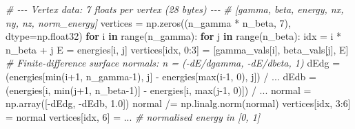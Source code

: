 \documentclass[
  11pt,
]{report}
\newenvironment{Shaded}{}{}
\newcommand{\BuiltInTok}[1]{\textcolor[rgb]{0.00,0.50,0.00}{#1}}
\newcommand{\CommentTok}[1]{\textcolor[rgb]{0.38,0.63,0.69}{\textit{#1}}}
\newcommand{\ControlFlowTok}[1]{\textcolor[rgb]{0.00,0.44,0.13}{\textbf{#1}}}
\newcommand{\DecValTok}[1]{\textcolor[rgb]{0.25,0.63,0.44}{#1}}
\newcommand{\FloatTok}[1]{\textcolor[rgb]{0.25,0.63,0.44}{#1}}
\newcommand{\KeywordTok}[1]{\textcolor[rgb]{0.00,0.44,0.13}{\textbf{#1}}}
\newcommand{\NormalTok}[1]{#1}
\newcommand{\OperatorTok}[1]{\textcolor[rgb]{0.40,0.40,0.40}{#1}}
\begin{document}
\begin{Shaded}
\begin{Highlighting}[]
    \CommentTok{\# {-}{-}{-} Vertex data: 7 floats per vertex (28 bytes) {-}{-}{-}}
    \CommentTok{\# [gamma, beta, energy, nx, ny, nz, norm\_energy]}
\NormalTok{    vertices }\OperatorTok{=}\NormalTok{ np.zeros((n\_gamma }\OperatorTok{*}\NormalTok{ n\_beta, }\DecValTok{7}\NormalTok{), dtype}\OperatorTok{=}\NormalTok{np.float32)}
    \ControlFlowTok{for}\NormalTok{ i }\KeywordTok{in} \BuiltInTok{range}\NormalTok{(n\_gamma):}
        \ControlFlowTok{for}\NormalTok{ j }\KeywordTok{in} \BuiltInTok{range}\NormalTok{(n\_beta):}
\NormalTok{            idx }\OperatorTok{=}\NormalTok{ i }\OperatorTok{*}\NormalTok{ n\_beta }\OperatorTok{+}\NormalTok{ j}
\NormalTok{            E }\OperatorTok{=}\NormalTok{ energies[i, j]}
\NormalTok{            vertices[idx, }\DecValTok{0}\NormalTok{:}\DecValTok{3}\NormalTok{] }\OperatorTok{=}\NormalTok{ [gamma\_vals[i], beta\_vals[j], E]}
            \CommentTok{\# Finite{-}difference surface normals: n = ({-}dE/dgamma, {-}dE/dbeta, 1)}
\NormalTok{            dEdg }\OperatorTok{=}\NormalTok{ (energies[}\BuiltInTok{min}\NormalTok{(i}\OperatorTok{+}\DecValTok{1}\NormalTok{, n\_gamma}\OperatorTok{{-}}\DecValTok{1}\NormalTok{), j] }\OperatorTok{{-}}\NormalTok{ energies[}\BuiltInTok{max}\NormalTok{(i}\OperatorTok{{-}}\DecValTok{1}\NormalTok{, }\DecValTok{0}\NormalTok{), j]) }\OperatorTok{/}\NormalTok{ ...}
\NormalTok{            dEdb }\OperatorTok{=}\NormalTok{ (energies[i, }\BuiltInTok{min}\NormalTok{(j}\OperatorTok{+}\DecValTok{1}\NormalTok{, n\_beta}\OperatorTok{{-}}\DecValTok{1}\NormalTok{)] }\OperatorTok{{-}}\NormalTok{ energies[i, }\BuiltInTok{max}\NormalTok{(j}\OperatorTok{{-}}\DecValTok{1}\NormalTok{, }\DecValTok{0}\NormalTok{)]) }\OperatorTok{/}\NormalTok{ ...}
\NormalTok{            normal }\OperatorTok{=}\NormalTok{ np.array([}\OperatorTok{{-}}\NormalTok{dEdg, }\OperatorTok{{-}}\NormalTok{dEdb, }\FloatTok{1.0}\NormalTok{])}
\NormalTok{            normal }\OperatorTok{/=}\NormalTok{ np.linalg.norm(normal)}
\NormalTok{            vertices[idx, }\DecValTok{3}\NormalTok{:}\DecValTok{6}\NormalTok{] }\OperatorTok{=}\NormalTok{ normal}
\NormalTok{            vertices[idx, }\DecValTok{6}\NormalTok{] }\OperatorTok{=}\NormalTok{ ...                  }\CommentTok{\# normalised energy in [0, 1]}


\end{Highlighting}
\end{Shaded}
\end{document}
